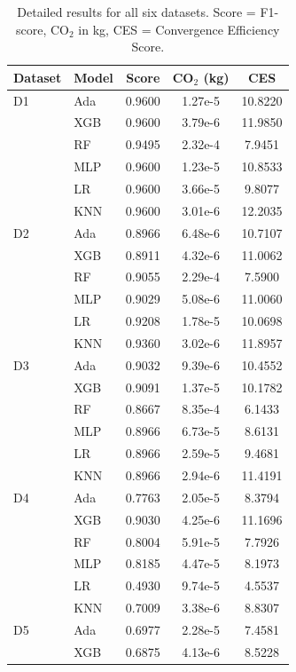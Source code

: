 \documentclass[conference]{IEEEtran}
\begin{document}
\begin{table}[htbp]
\centering
\caption{Detailed results for all six datasets. Score = F1-score, CO\(_2\) in kg, CES = Convergence Efficiency Score.}
\label{tab:main_results}
\footnotesize
\setlength{\tabcolsep}{3pt}
\begin{tabular}{llccc}
\toprule
\textbf{Dataset} & \textbf{Model} & \textbf{Score} & \textbf{CO\(_2\) (kg)} & \textbf{CES} \\
\midrule
D1 & Ada   & 0.9600 & 1.27e-5 & 10.8220 \\
    & XGB   & 0.9600 & 3.79e-6 & 11.9850 \\
    & RF    & 0.9495 & 2.32e-4 & 7.9451 \\
    & MLP   & 0.9600 & 1.23e-5 & 10.8533 \\
    & LR    & 0.9600 & 3.66e-5 & 9.8077 \\
    & KNN   & 0.9600 & 3.01e-6 & 12.2035 \\
\midrule
D2 & Ada   & 0.8966 & 6.48e-6 & 10.7107 \\
    & XGB   & 0.8911 & 4.32e-6 & 11.0062 \\
    & RF    & 0.9055 & 2.29e-4 & 7.5900 \\
    & MLP   & 0.9029 & 5.08e-6 & 11.0060 \\
    & LR    & 0.9208 & 1.78e-5 & 10.0698 \\
    & KNN   & 0.9360 & 3.02e-6 & 11.8957 \\
\midrule
D3 & Ada   & 0.9032 & 9.39e-6 & 10.4552 \\
    & XGB   & 0.9091 & 1.37e-5 & 10.1782 \\
    & RF    & 0.8667 & 8.35e-4 & 6.1433 \\
    & MLP   & 0.8966 & 6.73e-5 & 8.6131 \\
    & LR    & 0.8966 & 2.59e-5 & 9.4681 \\
    & KNN   & 0.8966 & 2.94e-6 & 11.4191 \\
\midrule
D4 & Ada   & 0.7763 & 2.05e-5 & 8.3794 \\
    & XGB   & 0.9030 & 4.25e-6 & 11.1696 \\
    & RF    & 0.8004 & 5.91e-5 & 7.7926 \\
    & MLP   & 0.8185 & 4.47e-5 & 8.1973 \\
    & LR    & 0.4930 & 9.74e-5 & 4.5537 \\
    & KNN   & 0.7009 & 3.38e-6 & 8.8307 \\
\midrule
D5 & Ada   & 0.6977 & 2.28e-5 & 7.4581 \\
    & XGB   & 0.6875 & 4.13e-6 & 8.5228 \\

\end{tabular}
\end{table}
\end{document}
